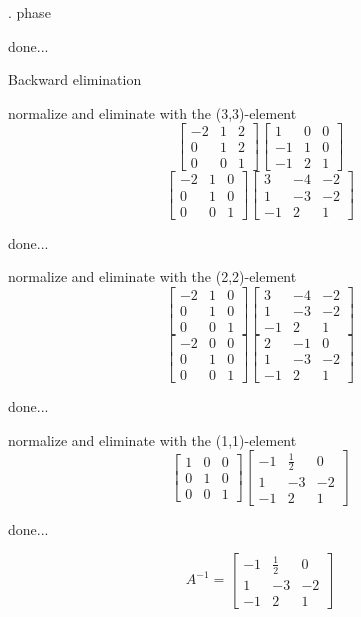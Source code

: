 \documentclass[12pt]{article}
\begin{document}
\par{}. phase

\par\noindent done...


\par\noindent Backward elimination


normalize and eliminate with the (3,3)-element
$$\left[{\begin{array}{ccc}-2& 1& 2\\ 0& 1& 2\\ 0& 0& 1\end{array}}\right]\left[{\begin{array}{ccc}1& 0& 0\\ -1& 1& 0\\ -1& 2& 1\end{array}}\right]$$
$$\left[{\begin{array}{ccc}-2& 1& 0\\ 0& 1& 0\\ 0& 0& 1\end{array}}\right]\left[{\begin{array}{ccc}3& -4& -2\\ 1& -3& -2\\ -1& 2& 1\end{array}}\right]$$
\par\noindent done...


normalize and eliminate with the (2,2)-element
$$\left[{\begin{array}{ccc}-2& 1& 0\\ 0& 1& 0\\ 0& 0& 1\end{array}}\right]\left[{\begin{array}{ccc}3& -4& -2\\ 1& -3& -2\\ -1& 2& 1\end{array}}\right]$$
$$\left[{\begin{array}{ccc}-2& 0& 0\\ 0& 1& 0\\ 0& 0& 1\end{array}}\right]\left[{\begin{array}{ccc}2& -1& 0\\ 1& -3& -2\\ -1& 2& 1\end{array}}\right]$$
\par\noindent done...


normalize and eliminate with the (1,1)-element
$$\left[{\begin{array}{ccc}1& 0& 0\\ 0& 1& 0\\ 0& 0& 1\end{array}}\right]\left[{\begin{array}{ccc}-1& \frac{1}{2}& 0\\ 1& -3& -2\\ -1& 2& 1\end{array}}\right]$$
\par\noindent done...


$$ A^{-1}=\left[{\begin{array}{ccc}-1& \frac{1}{2}& 0\\ 1& -3& -2\\ -1& 2& 1\end{array}}\right]$$
\end{document}
